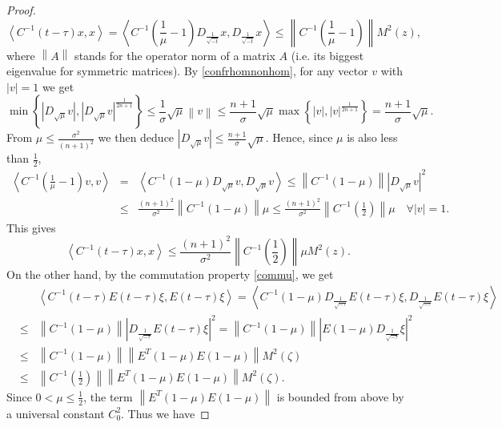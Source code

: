 \documentclass[10pt]{amsart}
\numberwithin{equation}{section}
\begin{document}
\begin{proof}
$$\left\langle C^{-1}(t-\tau)x,x\right\rangle=\left\langle C^{-1}\left(\frac{1}{\mu}-1	\right)D_{\frac{1}{\sqrt{-t}}}x,D_{\frac{1}{\sqrt{-t}}}x\right\rangle\leq \left\|C^{-1}\left(\frac{1}{\mu}-1\right)\right\|M^2(z),$$
where $\left\|A\right\|$ stands for the operator norm of a matrix $A$ (i.e. its biggest eigenvalue for symmetric matrices). By \eqref{confrhomnonhom}, for any vector $v$ with $\left|v\right|=1$ we get
$$\min{\left\{\left|D_{\sqrt{\mu}}v\right|,\left|D_{\sqrt{\mu}}v\right|^{\frac{1}{2n+1}}\right\}}\leq\frac{1}{\sigma}\sqrt{\mu}\left\|v\right\|\leq\frac{n+1}{\sigma}\sqrt{\mu}\max{\left\{\left|v\right|,\left|v\right|^{\frac{1}{2n+1}}\right\}}=\frac{n+1}{\sigma}\sqrt{\mu}.$$
From $\mu\leq \frac{\sigma^2}{(n+1)^2}$ we then deduce $\left|D_{\sqrt{\mu}}v\right|\leq \frac{n+1}{\sigma}\sqrt{\mu}$. Hence, since $\mu$ is also less than $\frac{1}{2}$,
\begin{eqnarray*}
\left\langle C^{-1}\left(\frac{1}{\mu}-1\right)v,v \right\rangle&=&\left\langle C^{-1}(1-\mu)D_{\sqrt{\mu}}v,D_{\sqrt{\mu}}v\right\rangle\leq \left\|C^{-1}(1-\mu)\right\|\left|D_{\sqrt{\mu}}v\right|^2\\
&\leq& \frac{(n+1)^2}{\sigma^2}\left\|C^{-1}(1-\mu)\right\|\mu\leq \frac{(n+1)^2}{\sigma^2}\left\|C^{-1}\left(\frac{1}{2}\right)\right\|\mu \quad \forall \left|v\right|=1.
\end{eqnarray*}
This gives
\begin{equation}\label{bx}
\left\langle C^{-1}(t-\tau)x,x\right\rangle\leq \frac{(n+1)^2}{\sigma^2}\left\|C^{-1}\left(\frac{1}{2}\right)\right\|\mu M^2(z).
\end{equation}
On the other hand, by the commutation property \eqref{commu}, we get
\begin{eqnarray*}
&&\left\langle C^{-1}(t-\tau)E(t-\tau)\xi,E(t-\tau)\xi\right\rangle=\left\langle C^{-1}(1-\mu)D_{\frac{1}{\sqrt{-\tau}}}E(t-\tau)\xi,D_{\frac{1}{\sqrt{-\tau}}}E(t-\tau)\xi\right\rangle\\
&\leq&\left\|C^{-1}(1-\mu)\right\|\left|D_{\frac{1}{\sqrt{-\tau}}}E(t-\tau)\xi\right|^2=\left\|C^{-1}(1-\mu)\right\|\left|E(1-\mu)D_{\frac{1}{\sqrt{-\tau}}}\xi\right|^2\\
&\leq&\left\|C^{-1}(1-\mu)\right\|\left\|E^T(1-\mu)E(1-\mu)\right\|M^2(\zeta)\\
&\leq&\left\|C^{-1}\left(\frac{1}{2}\right)\right\|\left\|E^T(1-\mu)E(1-\mu)\right\|M^2(\zeta).
\end{eqnarray*}
Since $0<\mu\leq\frac{1}{2}$, the term $\left\|E^T(1-\mu)E(1-\mu)\right\|$ is bounded from above by a universal constant $C_0^2$. Thus we have

\end{proof}
\end{document}
